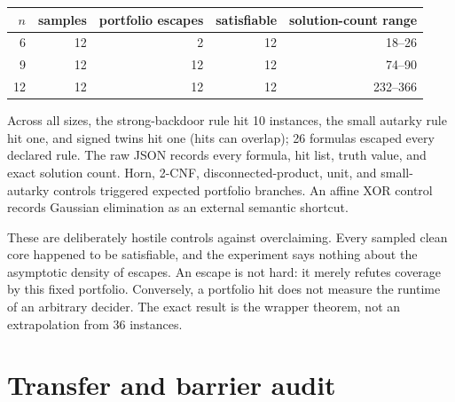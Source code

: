 \documentclass[11pt]{article}
\begin{document}
\begin{center}
\begin{tabular}{rrrrr}
\toprule
$n$ & samples & portfolio escapes & satisfiable & solution-count range\\
\midrule
6  & 12 & 2  & 12 & 18--26\\
9  & 12 & 12 & 12 & 74--90\\
12 & 12 & 12 & 12 & 232--366\\
\bottomrule
\end{tabular}
\end{center}

Across all sizes, the strong-backdoor rule hit 10 instances, the small
autarky rule hit one, and signed twins hit one (hits can overlap); 26 formulas
escaped every declared rule.  The raw JSON records every formula, hit list,
truth value, and exact solution count.  Horn, 2-CNF, disconnected-product,
unit, and small-autarky controls triggered expected portfolio branches.  An
affine XOR control records Gaussian elimination as an external semantic
shortcut.

These are deliberately hostile controls against overclaiming.  Every sampled
clean core happened to be satisfiable, and the experiment says nothing about
the asymptotic density of escapes.  An escape is not hard: it merely refutes
coverage by this fixed portfolio.  Conversely, a portfolio hit does not
measure the runtime of an arbitrary decider.  The exact result is the wrapper
theorem, not an extrapolation from 36 instances.

\section{Transfer and barrier audit}
\end{document}
